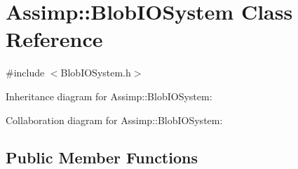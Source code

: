 \hypertarget{class_assimp_1_1_blob_i_o_system}{\section{Assimp\+:\+:Blob\+I\+O\+System Class Reference}
\label{class_assimp_1_1_blob_i_o_system}
}


{\ttfamily \#include $<$Blob\+I\+O\+System.\+h$>$}



Inheritance diagram for Assimp\+:\+:Blob\+I\+O\+System\+:


Collaboration diagram for Assimp\+:\+:Blob\+I\+O\+System\+:
\subsection*{Public Member Functions}
